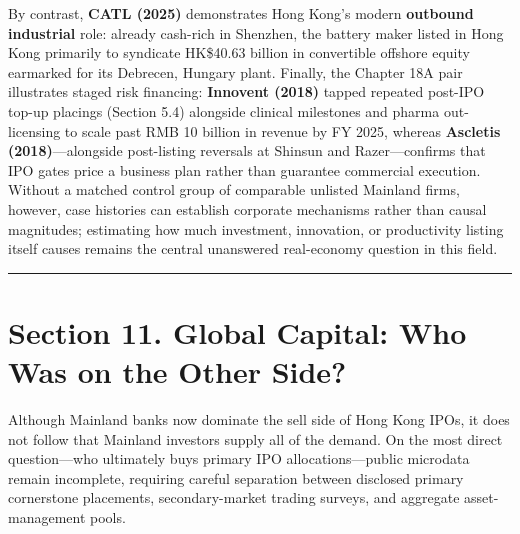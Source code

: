 \documentclass[11pt,letterpaper]{article}
\begin{document}
By contrast, \textbf{CATL (2025)} demonstrates Hong Kong's modern \textbf{outbound industrial} role: already cash-rich in Shenzhen, the battery maker listed in Hong Kong primarily to syndicate HK\$40.63 billion in convertible offshore equity earmarked for its Debrecen, Hungary plant. Finally, the Chapter 18A pair illustrates staged risk financing: \textbf{Innovent (2018)} tapped repeated post-IPO top-up placings (Section 5.4) alongside clinical milestones and pharma out-licensing to scale past RMB 10 billion in revenue by FY 2025, whereas \textbf{Ascletis (2018)}—alongside post-listing reversals at Shinsun and Razer—confirms that IPO gates price a business plan rather than guarantee commercial execution. Without a matched control group of comparable unlisted Mainland firms, however, case histories can establish corporate mechanisms rather than causal magnitudes; estimating how much investment, innovation, or productivity listing itself causes remains the central unanswered real-economy question in this field.

\par\medskip\noindent\rule{\linewidth}{0.35pt}\par\medskip
\section*{\texorpdfstring{Section 11. Global Capital: Who Was on the Other Side?}{Section 11. Global Capital: Who Was on the Other Side?}}
Although Mainland banks now dominate the sell side of Hong Kong IPOs, it does not follow that Mainland investors supply all of the demand. On the most direct question—who ultimately buys primary IPO allocations—public microdata remain incomplete, requiring careful separation between disclosed primary cornerstone placements, secondary-market trading surveys, and aggregate asset-management pools.
\end{document}

